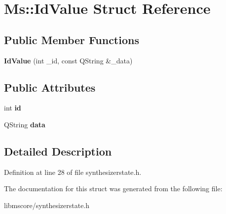 \hypertarget{struct_ms_1_1_id_value}{}\section{Ms\+:\+:Id\+Value Struct Reference}
\label{struct_ms_1_1_id_value}
\subsection*{Public Member Functions}
\begin{DoxyCompactItemize}
\item 
\mbox{\label{struct_ms_1_1_id_value_ab9424d68ac6085e0fbed9e707b25d97e}} 
{\bfseries Id\+Value} (int \+\_\+id, const Q\+String \&\+\_\+data)
\end{DoxyCompactItemize}
\subsection*{Public Attributes}
\begin{DoxyCompactItemize}
\item 
\mbox{\label{struct_ms_1_1_id_value_a1f11c17b168f506f44b040ec7981af8d}} 
int {\bfseries id}
\item 
\mbox{\label{struct_ms_1_1_id_value_aa7f7b059200001809d2e2362c5b15bca}} 
Q\+String {\bfseries data}
\end{DoxyCompactItemize}


\subsection{Detailed Description}


Definition at line 28 of file synthesizerstate.\+h.



The documentation for this struct was generated from the following file\+:\begin{DoxyCompactItemize}
\item 
libmscore/synthesizerstate.\+h\end{DoxyCompactItemize}
